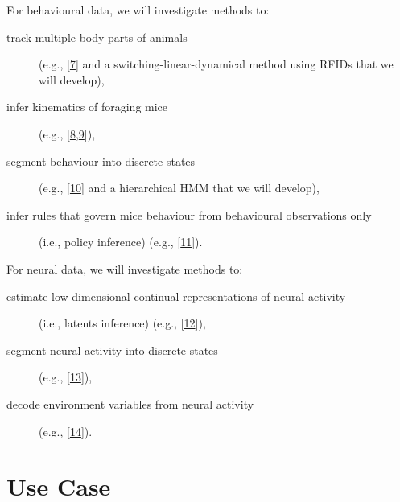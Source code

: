 \documentclass{article}
\begin{document}
For behavioural data, we will investigate methods to:

\begin{description}

    \item[track multiple body parts of animals] (e.g.,
        [\href{https://pubmed.ncbi.nlm.nih.gov/30127430/}{7}] and a
        switching-linear-dynamical method using RFIDs that we will develop),

    \item[infer kinematics of foraging mice] (e.g.,
        [\href{https://github.com/joacorapela/lds\_python}{8},\href{https://www.cambridge.org/core/books/fundamentals-of-object-tracking/A543B0EA12957B353BE4B5D0602EE945}{9}]),

    \item[segment behaviour into discrete states] (e.g.,
        [\href{https://pubmed.ncbi.nlm.nih.gov/26687221/}{10}]
        and a hierarchical HMM that we will develop),

    \item[infer rules that govern mice behaviour from behavioural
        observations only] (i.e., policy inference) (e.g.,
        [\href{https://arxiv.org/abs/2311.13870v2}{11}]).

\end{description}

For neural data, we will investigate methods to:

\begin{description}

    \item[estimate low-dimensional continual representations of neural
        activity]
        (i.e., latents inference) (e.g.,
        [\href{https://papers.nips.cc/paper_files/paper/2011/hash/7143d7fbadfa4693b9eec507d9d37443-Abstract.html}{12}]),

    \item[segment neural activity into discrete states] (e.g.,
        [\href{https://pubmed.ncbi.nlm.nih.gov/21299424/}{13}]),

    \item[decode environment variables from neural activity] (e.g.,
        [\href{https://pubmed.ncbi.nlm.nih.gov/25973549/}{14}]).

\end{description}

\section{Use Case}
\end{document}

